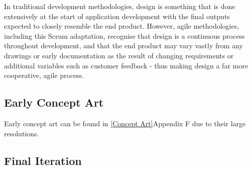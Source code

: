 In traditional development methodologies, design is something that is done extensively at the start of application development with the final outputs expected to closely resemble the end product. However, agile methodologies, including this Scrum adaptation, recognise that design is a continuous process throughout development, and that the end product may vary vastly from any drawings or early documentation as the result of changing requirements or additional variables such as customer feedback - thus making design a far more cooperative, agile process. \cite{Kiss1}

\subsection{Early Concept Art}
Early concept art can be found in \ref{Concept Art}Appendix F due to their large resolutions.

\subsection{Final Iteration}
